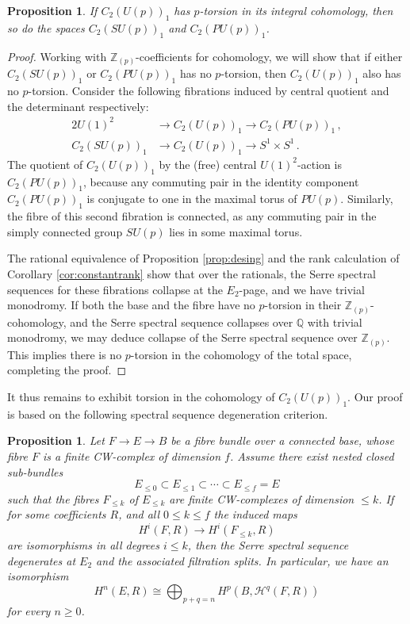 \documentclass[oneside, 12pt, a4paper]{amsart}
\numberwithin{equation}{section}
\newcommand{\Z}{\mathbb{Z}}
\newcommand{\Q}{\mathbb{Q}}
\theoremstyle{plain}
\newtheorem{proposition}[theorem]{Proposition}
\theoremstyle{definition}
\theoremstyle{remark}
\begin{document}
\begin{proposition}\label{prop:U(p) reduction}
If $C_2(U(p))_1$ has $p$-torsion in its integral cohomology, then so do the spaces $C_2(SU(p))_1$ and $C_2(PU(p))_1$.
\end{proposition}

\begin{proof}
Working with $\Z_{(p)}$-coefficients for cohomology, we will show that if either $C_2(SU(p))_1$ or $ C_2(PU(p))_1$ has no $p$-torsion, then $C_2(U(p))_1$ also has no $p$-torsion. Consider the following fibrations induced by central quotient and the determinant respectively:
\begin{alignat*}{2}
U(1)^2& \to C_2(U(p))_1\to C_2(PU(p))_1\,, \\
C_2(SU(p))_1& \to C_2(U(p))_1\to S^1\times S^1\, .
\end{alignat*}
The quotient of $C_2(U(p))_1$ by the (free) central $U(1)^2$-action is $C_2(PU(p))_1$, because any commuting pair in the identity component $C_2(PU(p))_1$ is conjugate to one in the maximal torus of $PU(p)$. Similarly, the fibre of this second fibration is connected, as any commuting pair in the simply connected group $SU(p)$ lies in some maximal torus.

The rational equivalence of Proposition \ref{prop:desing} and the rank calculation of Corollary \ref{cor:constantrank} show that over the rationals, the Serre spectral sequences for these fibrations collapse at the $E_2$-page, and we have trivial monodromy. If both the base and the fibre have no $p$-torsion in their $\mathbb{Z}_{(p)}$-cohomology, and the Serre spectral sequence collapses over $\Q$ with trivial monodromy, we may deduce collapse of the Serre spectral sequence over $\Z_{(p)}$. This implies there is no $p$-torsion in the cohomology of the total space, completing the proof.
\end{proof}

It thus remains to exhibit torsion in the cohomology of $C_2(U(p))_1$. Our proof is based on the following spectral sequence degeneration criterion.

\begin{proposition} \label{prop:ss}
Let $F\to E\to B$ be a fibre bundle over a connected base, whose fibre $F$ is a finite CW-complex of dimension $f$. Assume there exist nested closed sub-bundles \[E_{\leq 0}\subset E_{\leq 1}\subset \cdots \subset E_{\leq f}=E\] such that the fibres $F_{\leq k}$ of $E_{\leq k}$ are finite CW-complexes of dimension $\leq k$. If for some coefficients $R$, and all $0\leq k\leq f$ the induced maps\[H^i(F,R)\to H^i(F_{\leq k},R)\] are isomorphisms in all degrees $i \leq k$, then the Serre spectral sequence degenerates at $E_2$ and the associated filtration splits. In particular, we have an isomorphism\[H^n(E,R)\cong \bigoplus_{p+q=n} H^p(B,\mathcal{H}^q(F,R))\]
for every $n\geq 0$.
\end{proposition}
\end{document}
